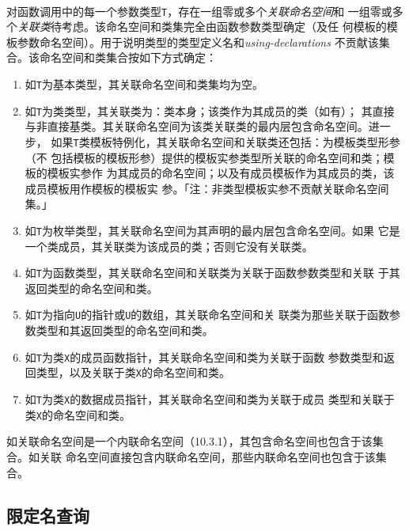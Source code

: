 \paragraph{}
对函数调用中的每一个参数类型\texttt{T}，存在一组零或多个\textit{关联命名空间}和
一组零或多个\textit{关联类}待考虑。该命名空间和类集完全由函数参数类型确定（及任
何模板的模板参数命名空间）。用于说明类型的类型定义名和\textit{using-declarations}
不贡献该集合。该命名空间和类集合按如下方式确定：
\begin{enumerate}
  \item{如\texttt{T}为基本类型，其关联命名空间和类集均为空。}
  \item{如\texttt{T}为类类型，其关联类为：类本身；该类作为其成员的类（如有）；
    其直接与非直接基类。其关联命名空间为该类关联类的最内层包含命名空间。进一步，
    如果\texttt{T}类模板特例化，其关联命名空间和关联类还包括：为模板类型形参（不
    包括模板的模板形参）提供的模板实参类型所关联的命名空间和类；模板的模板实参作
    为其成员的命名空间；以及有成员模板作为其成员的类，该成员模板用作模板的模板实
    参。「注：非类型模板实参不贡献关联命名空间集。」}
  \item{如\texttt{T}为枚举类型，其关联命名空间为其声明的最内层包含命名空间。如果
    它是一个类成员，其关联类为该成员的类；否则它没有关联类。}
  \item{如\texttt{T}为函数类型，其关联命名空间和关联类为关联于函数参数类型和关联
    于其返回类型的命名空间和类。}
  \item{如\texttt{T}为指向\texttt{U}的指针或\texttt{U}的数组，其关联命名空间和关
    联类为那些关联于函数参数类型和其返回类型的命名空间和类。}
  \item{如\texttt{T}为类\texttt{X}的成员函数指针，其关联命名空间和类为关联于函数
    参数类型和返回类型，以及关联于类\texttt{X}的命名空间和类。}
  \item{如\texttt{T}为类\texttt{X}的数据成员指针，其关联命名空间和类为关联于成员
    类型和关联于类\texttt{X}的命名空间和类。}
\end{enumerate}
如关联命名空间是一个内联命名空间（10.3.1），其包含命名空间也包含于该集合。如关联
命名空间直接包含内联命名空间，那些内联命名空间也包含于该集合。

\paragraph{}

\subsection{限定名查询}
